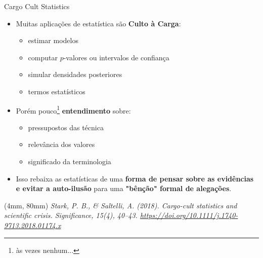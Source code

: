 \documentclass[12pt, xcolor=dvipsnames]{beamer}
\newenvironment{reference}[2]{                                    %
  \begin{textblock*}{\textwidth}(#1, #2)
      \tiny\it\bgroup\color{red!70!QPblue}}{\egroup\end{textblock*}}
\begin{document}

\begin{frame}{Cargo Cult Statistics}
  \begin{itemize}
      \item<2-> Muitas aplicações de estatística são \textbf{Culto à Carga}:
      \begin{itemize}
        \item<3-> estimar modelos
        \item<3-> computar $p$-valores ou intervalos de confiança
        \item<3-> simular densidades posteriores
        \item<3-> termos estatísticos
      \end{itemize}
      \item<4-> Porém pouco\footnote<4->{às vezes nenhum...} \textbf{entendimento} sobre:
      \begin{itemize}
        \item<5-> pressupostos das técnica
        \item<5-> relevância dos valores
        \item<5-> significado da terminologia
      \end{itemize}
      \item<6-> Isso rebaixa as estatísticas de uma \textbf{forma de pensar sobre as evidências e evitar a auto-ilusão}
      para uma \textbf{"bênção" formal de alegações}.
    \end{itemize}
  \begin{reference}{4mm}{80mm}
    Stark, P. B., \& Saltelli, A. (2018). Cargo-cult statistics and scientific crisis. Significance, 15(4), 40–43.
    \url{https://doi.org/10.1111/j.1740-9713.2018.01174.x}
  \end{reference}
\end{frame}


\end{document}
